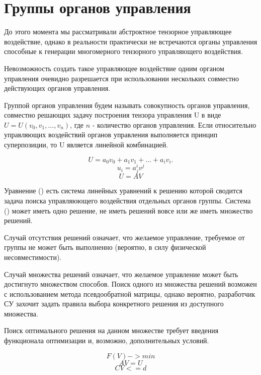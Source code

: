 \documentclass[a4paper]{article}
\begin{document}
\section{Группы органов управления}
До этого момента мы рассматривали абстроктное тензорное управляющее воздействие, однако в реальности практически не встречаются органы управления способные к генерации многомерного тензорного управляющего воздействия.

Невозможность создать такое управляющее воздействие одним органом управления очевидно разрешается при использовании нескольких совместно действующих органов управления.

Группой органов управления будем называть совокупность органов управления, совместно решающих задачу построения тензора управления U в виде $U = U(v_0, v_1, ..., v_n)$, где $n$ - количество органов управления. Если относительно управляющих воздействий органов управления выполняется принцип суперпозиции, то U является линейной комбинацией. 

\begin{equation}U = a_0v_0 + a_1v_1 + ... + a_iv_i.\end{equation}
\begin{equation}u_i=a^i_jv^j\end{equation}
\begin{equation}U = AV\end{equation}

Уравнение () есть система линейных уравнений к решению которой сводится задача поиска управляюющего воздействия отдельных органов группы. Система () может иметь одно решение, не иметь решений вовсе или же иметь множество решений.

Случай отсутствия решений означает, что желаемое управление, требуемое от группы не может быть выполненно (вероятно, в силу физической несовместимости). 

Случай множества решений означает, что желаемое управление может быть достигнуто множеством способов. 
Поиск одного из множества решений возможен с использованием метода псевдообратной матрицы, однако вероятно, разработчик СУ захочит задать правила выбора конкретного решения из доступного множества.

Поиск оптимального решения на данном множестве требует введения функционала оптимизации и, возможно, дополнительных условий.

\begin{equation}F(V) -> min\end{equation}
\begin{equation}AV = U\end{equation}
\begin{equation}CV <= d\end{equation}
\end{document}
